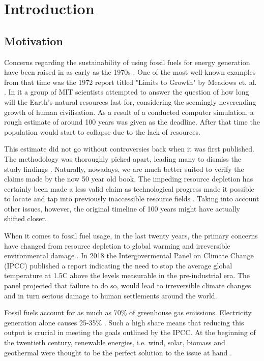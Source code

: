 \section{Introduction}


\subsection{Motivation}
  Concerns regarding the sustainability of using fossil fuels for energy generation
  have been raised in as early as the 1970s \cite{rethinking_resource_depletion}. 
  One of the most well-known examples from that time was the 1972 report
  titled "Limits to Growth" by Meadows et. al. \cite{limits_to_growth}.
  In it a group of MIT scientists attempted to answer the question of
  how long will the Earth's natural resources last for,
  considering the seemingly neverending growth of human civilisation.
  As a result of a conducted computer simulation,
  a rough estimate of around 100 years was given as the deadline.
  After that time the population would start to collapse due to the lack of resources.


  This estimate did not go without controversies back when it was first published.
  The methodology was thoroughly picked apart,
  leading many to dismiss the study findings
  \cite{rethinking_resource_depletion}.
  Naturally, nowadays, we are much better suited to verify
  the claims made by the now 50 year old book. The impeding resource depletion
  has certainly been made a less valid claim as technological progress
  made it possible to locate and tap into
  previously inaccessible resource fields
  \cite{shaping_the_global_oil_peak}.
  Taking into account other issues, however, 
  the original timeline of 100 years might have
  actually shifted closer. 


  When it comes to fossil fuel usage, in the last twenty years, 
  the primary concerns have changed from resource depletion to global warming 
  and irreversible environmental damage \cite{rethinking_resource_depletion}.
  In 2018 the Intergovermental Panel on Climate Change (IPCC) published a
  report indicating the need to stop the average global temperature 
  at 1.5\degree C above the levels measurable in the pre-industrial era.
  The panel projected that failure to do so, would lead to irreversible climate changes
  and in turn serious damage to human settlements around the world.
  \cite{ipcc2018}


  Fossil fuels account for as much as 70\% of greenhouse gas emissions.
  Electricity generation alone causes 25-35\% 
  \cite{global_climate_change}.
  Such a high share means that reducing this output
  is crucial in meeting the goals outlined by the IPCC.
  At the beginning of the twentieth century, renewable energies, i.e. 
  wind, solar, biomass and geothermal were thought
  to be the perfect solution to the issue at hand
  \cite{renewable_review_2000}. 


